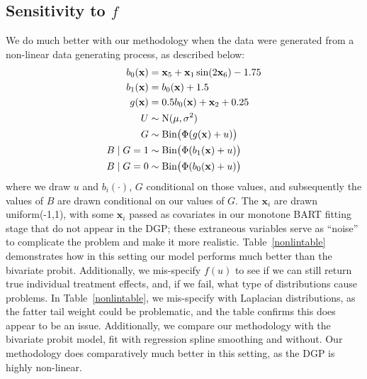 \documentclass[aoas,preprint, 11pt, dvipsnames, table, x11name]{imsart}
\renewcommand{\bm}[1]{\mathbf{#1}}
\theoremstyle{remark}
\begin{document}
	
	
	\subsection{Sensitivity to $f$}\label{nonlindgp}
	
	
	
	We do much better with our methodology when the data were generated from a non-linear data generating process, as described below:
	\begin{align}
		\begin{split}
			b_0(\bm{x})&=\bm{x}_5+\bm{x}_1 \sin(2\bm{x}_6)-1.75\\
			b_1(\bm{x})&=b_0(\bm{x})+1.5\\
			g(\bm{x})&=0.5 b_0(\bm{x})+\bm{x}_2+0.25\\
			U&\sim \mbox{N}(\mu,\sigma^2)\\
			G&\sim \text{Bin}\qty(\Phi(g(\bm{x})+u)) \\
			B\mid G=1&\sim\text{Bin}\qty(\Phi(b_1(\bm{x})+u))\\
			B\mid G=0&\sim \text{Bin}\qty(\Phi(b_0(\bm{x})+u))
		\end{split}
		\label{newnonlinmodel}
	\end{align}
	where we draw $u$ and $b_i(\cdot)$, $G$ conditional on those values, and subsequently  the values of $B$ are drawn conditional on our values of $G$. The $\bm{x}_i$ are drawn uniform(-1,1), with some $\bm{x}_i$ passed as covariates in our monotone BART fitting stage that do not appear in the DGP; these extraneous variables serve as ``noise'' to complicate the problem and make it more realistic.  Table~\ref{nonlintable} demonstrates how in this setting our model performs much better than the bivariate probit.
	Additionally, we mis-specify $f(u)$ to see if we can still return true individual treatment effects, and, if we fail, what type of distributions cause problems.  In Table~\ref{nonlintable}, we mis-specify with Laplacian distributions, as the fatter tail weight could be problematic, and the table confirms this does appear to be an issue.  Additionally, we compare our methodology with the bivariate probit model, fit with regression spline smoothing and without.  Our methodology does comparatively much better in this setting, as the DGP is highly non-linear. 
	
\end{document}
